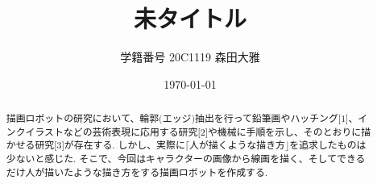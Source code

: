 \documentclass[a4j]{jarticle}			%
\title{未タイトル}
\author{学籍番号 20C1119 森田大雅}
\date{\today}
\begin{document}
\maketitle %
\normalsize


\begin{abstract}
描画ロボットの研究において、輪郭$\lparen\text{エッジ}\rparen$抽出を行って鉛筆画やハッチング$\lbrack1\rbrack$、インクイラストなどの芸術表現に応用する研究$\lbrack2\rbrack$や機械に手順を示し、そのとおりに描かせる研究$\lbrack3\rbrack$が存在する.
しかし、実際に$\lceil \text{人が描くような描き方} \rfloor$を追求したものは少ないと感じた.
そこで、今回はキャラクターの画像から線画を描く、そしてできるだけ人が描いたような描き方をする描画ロボットを作成する.
\end{abstract}
\end{document}
